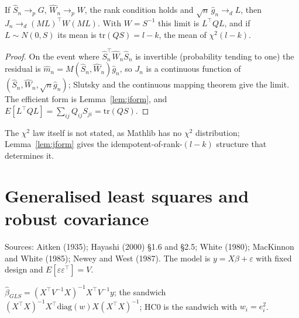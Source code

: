 \begin{theorem}
\label{thm:jtest}
\leanok
{}
If $\hat S_n\to_p G$, $\hat W_n\to_p W$, the rank condition holds and $\sqrt n\,\hat g_n\to_d L$, then
$J_n \to_d (ML)^\top W(ML)$. With $W = S^{-1}$ this limit is $L^\top QL$, and if $L\sim N(0,S)$ its mean is
$\mathrm{tr}(QS) = l - k$, the mean of $\chi^2(l-k)$.
\end{theorem}
\begin{proof}
\leanok
On the event where $\hat S_n^\top\hat W_n\hat S_n$ is invertible (probability tending to one) the residual is
$\hat m_n = M(\hat S_n,\hat W_n)\hat g_n$, so $J_n$ is a continuous function of $(\hat S_n,\hat W_n,\sqrt n\hat g_n)$;
Slutsky and the continuous mapping theorem give the limit. The efficient form is Lemma~\ref{lem:jform}, and
$E[L^\top QL] = \sum_{ij}Q_{ij}S_{ji} = \mathrm{tr}(QS)$.
\end{proof}

The $\chi^2$ law itself is not stated, as Mathlib has no $\chi^2$ distribution; Lemma~\ref{lem:jform} gives the
idempotent-of-rank-$(l-k)$ structure that determines it.

\section{Generalised least squares and robust covariance}
\label{sec:gls}

Sources: Aitken (1935); Hayashi (2000) \S1.6 and \S2.5; White (1980); MacKinnon and White (1985); Newey and West
(1987). The model is $y = X\beta+\varepsilon$ with fixed design and $E[\varepsilon\varepsilon^\top] = V$.

\begin{definition}
\label{def:gls}
\leanok
$\hat\beta_{GLS} = (X^\top V^{-1}X)^{-1}X^\top V^{-1}y$; the sandwich
$(X^\top X)^{-1}X^\top\mathrm{diag}(w)X(X^\top X)^{-1}$; HC0 is the sandwich with $w_i = e_i^2$.
\end{definition}


